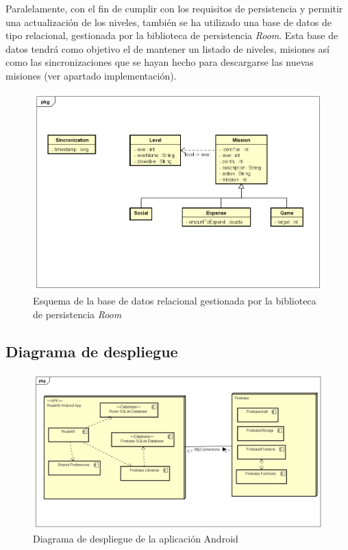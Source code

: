\documentclass[twoside]{report}
\begin{document}
Paralelamente, con el fin de cumplir con los requisitos de persistencia y permitir una actualización de los niveles, también se ha utilizado una base de datos de tipo relacional, gestionada por la biblioteca de persistencia \cite{roompersistence} \textit{Room}. Esta base de datos tendrá como objetivo el de mantener un listado de niveles, misiones así como las sincronizaciones que se hayan hecho para descargarse las nuevas misiones (ver apartado implementación).

\begin{figure}[H]
\centering
\includegraphics[scale=0.5]{images/databaseRoom}
\caption{Esquema de la base de datos relacional gestionada por la biblioteca de persistencia \cite{roompersistence} \textit{Room}}
\end{figure}

\subsection{Diagrama de despliegue}

\begin{figure}[H]
\centering
\includegraphics[scale=0.5]{images/deploymentModel}
\caption{Diagrama de despliegue de la aplicación Android}
\end{figure}
\end{document}
